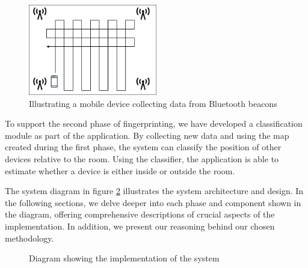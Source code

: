 \begin{figure}[H]
    \centering
    \includegraphics[width=0.5\textwidth]{images/CreateMap.drawio.png}
    \caption{Illustrating a mobile device collecting data from Bluetooth beacons}
    \label{fig:CreateMap}
\end{figure}

To support the second phase of fingerprinting, we have developed a classification module as part of the application. 
By collecting new data and using the map created during the first phase, the system can classify the position of other devices relative to the room. 
Using the classifier, the application is able to estimate whether a device is either inside or outside the room.

The system diagram in figure \ref{fig:implementation_diagram} illustrates the system architecture and design.
In the following sections, we delve deeper into each phase and component shown in the diagram, offering comprehensive descriptions of crucial aspects of the implementation.
In addition, we present our reasoning behind our chosen methodology.

\begin{figure}[H]
  \centering
  \caption{Diagram showing the implementation of the system}
  \label{fig:implementation_diagram}
\end{figure}
